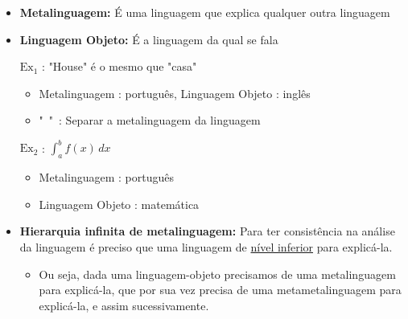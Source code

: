             \begin{itemize}[left=0.5cm, align=left, nosep]
                \item \textbf{Metalinguagem:} É uma linguagem que explica qualquer outra linguagem   
                \item \textbf{Linguagem Objeto:} É a linguagem da qual se fala
                 
                $\text{Ex}_1$ : "House" é o mesmo que "casa"   
                \begin{itemize}[left=0.5cm, nosep, label=$\hookrightarrow$]
                    \item Metalinguagem : português, Linguagem Objeto : inglês
                    \item "\ "\ : Separar a metalinguagem da linguagem
                \end{itemize}
        
                \vspace{0.5cm}
                $\text{Ex}_2$ : $\int_{a}^{b} f(x) \,dx$   
                \begin{itemize}[left=0.5cm, nosep, label=$\hookrightarrow$]
                    \item Metalinguagem : português
                    \item Linguagem Objeto : matemática
                \end{itemize}
                
                \item \textbf{Hierarquia infinita de metalinguagem:} Para ter consistência na análise da linguagem é 
                preciso que uma linguagem de \underline{nível inferior} para explicá-la.
                
                \begin{itemize}[left=0.5cm, nosep, label=$\hookrightarrow$]
                    \item Ou seja, dada uma linguagem-objeto precisamos de uma metalinguagem para 
                    explicá-la, que por sua vez precisa de uma metametalinguagem para explicá-la, 
                    e assim sucessivamente. 
                \end{itemize}

                \vspace{0.5cm}

                \begin{center}
\end{center}
\end{itemize}
